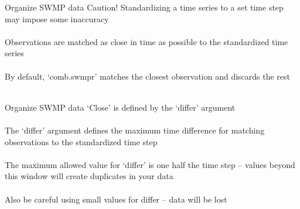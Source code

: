 \documentclass[xcolor=svgnames]{beamer}\usepackage[]{graphicx}\usepackage[]{color}
\begin{document}
\begin{frame}[containsverbatim]{Organize SWMP data}
\alert{Caution!} Standardizing a time series to a set time step may impose some inaccuracy \\~\\
Observations are matched as close in time as possible to the standardized time series \\~\\
By default, `comb.swmpr' matches the closest observation and discards the rest \\~\\
\end{frame}

\begin{frame}[containsverbatim]{Organize SWMP data}
`Close' is defined by the `differ' argument\\~\\
The `differ' argument defines the maximum time difference for matching observations to the standardized time step \\~\\
The maximum allowed value for `differ' is one half the time step -- values beyond this window will create duplicates in your data \\~\\
Also be careful using small values for differ -- data will be lost
\end{frame}
\end{document}
